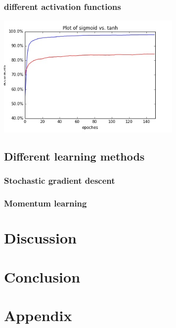 \documentclass[12pt,a4paper]{article}
\begin{document}
\subsubsection{different activation functions}
\includegraphics[width=90mm,scale=1]{p301.jpg}\\


\subsection{Different learning methods}
\subsubsection{Stochastic gradient descent}
\subsubsection{Momentum learning}


\section{Discussion}


\section{Conclusion}


\newpage
\section{Appendix}
\end{document}
